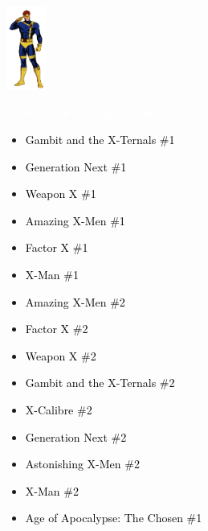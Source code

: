 \documentclass[12pt]{article}
\newcommand{\checkbox}{\raisebox{0.0ex}{\fbox{\rule{0ex}{1.5ex} \rule{1.5ex}{0ex}}}}
\begin{document}
\begin{center}
    \vspace*{2cm}
    \includegraphics[width=0.1\textwidth]{cyclops.png}
    \vspace{0.3cm}

    {\Huge \textbf{\textcolor{white}{X-Men Chronological Checklist}}}
\end{center}

\vspace{0.3cm}
\noindent
\begin{tcolorbox}[
  colback=white!95!gray,
  colframe=black,
  width=\textwidth,
  arc=4mm,
  auto outer arc,
  boxrule=0.8pt,
  left=8pt,right=8pt,top=8pt,bottom=8pt
]
\begin{itemize}[left=0pt,label={\checkbox}]
  \item \textcolor{black}{Gambit and the X-Ternals \#1}
  \item \textcolor{black}{Generation Next \#1}
  \item \textcolor{black}{Weapon X \#1}
  \item \textcolor{black}{Amazing X-Men \#1}
  \item \textcolor{black}{Factor X \#1}
  \item \textcolor{black}{X-Man \#1}
  \item \textcolor{black}{Amazing X-Men \#2}
  \item \textcolor{black}{Factor X \#2}
  \item \textcolor{black}{Weapon X \#2}
  \item \textcolor{black}{Gambit and the X-Ternals \#2}
  \item \textcolor{black}{X-Calibre \#2}
  \item \textcolor{black}{Generation Next \#2}
  \item \textcolor{black}{Astonishing X-Men \#2}
  \item \textcolor{black}{X-Man \#2}
  \item \textcolor{black}{Age of Apocalypse: The Chosen \#1}
\end{itemize}
\end{tcolorbox}
\end{document}
